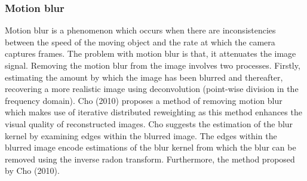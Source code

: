 \documentclass[a4paper, 16pt]{article}
\begin{document}
\subsubsection{ Motion blur}

Motion blur is a phenomenon which occurs when there are inconsistencies between the speed of the moving object and the rate at which the camera captures frames. The problem with motion blur is that, it attenuates the image signal. Removing the motion blur from the image involves two processes. Firstly, estimating the amount by which the image has been blurred and thereafter, recovering a more realistic image using  deconvolution (point-wise division in the frequency domain). Cho (2010) proposes a method of removing motion blur which makes use of iterative distributed reweighting as this method enhances the visual quality of reconstructed images. Cho suggests the estimation of the blur kernel by examining edges within the blurred image. The edges within the blurred image encode estimations of the blur kernel from which the blur can be removed using the inverse radon transform. Furthermore, the method proposed by Cho (2010).
\end{document}
